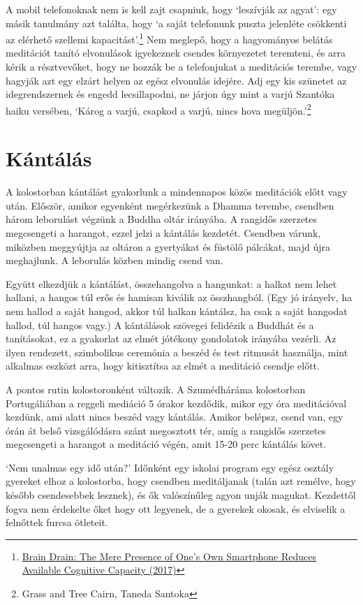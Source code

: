 A mobil telefonoknak nem is kell zajt csapniuk, hogy `leszívják az
agyat': egy másik tanulmány azt találta, hogy `a saját telefonunk puszta
jelenléte csökkenti az elérhető szellemi kapacitást'.\footnote{\href{https://www.journals.uchicago.edu/doi/10.1086/691462}{Brain
  Drain: The Mere Presence of One's Own Smartphone Reduces Available
  Cognitive Capacity (2017)}} Nem meglepő, hogy a hagyományos belátás
meditációt tanító elvonulások igyekeznek csendes környezetet teremteni,
és arra kérik a résztvevőket, hogy ne hozzák be a telefonjukat a
meditációs terembe, vagy hagyják azt egy elzárt helyen az egész
elvonulás idejére. Adj egy kis szünetet az idegrendszernek és engedd
lecsillapodni, ne járjon úgy mint a varjú Szantóka haiku versében,
`Károg a varjú, csapkod a varjú, nincs hova megüljön.'\footnote{Grass
  and Tree Cairn, Taneda Santoka}

\section{Kántálás}

A kolostorban kántálást gyakorlunk a mindennapos közös meditációk előtt
vagy után. Először, amikor egyenként megérkezünk a Dhamma terembe,
csendben három leborulást végzünk a Buddha oltár irányába. A rangidős
szerzetes megcsengeti a harangot, ezzel jelzi a kántálás kezdetét.
Csendben várunk, miközben meggyújtja az oltáron a gyertyákat és füstölő
pálcákat, majd újra meghajlunk. A leborulás közben mindig csend van.

Együtt elkezdjük a kántálást, összehangolva a hangunkat: a halkat nem
lehet hallani, a hangos túl erős és hamisan kiválik az összhangból. (Egy
jó irányelv, ha nem hallod a saját hangod, akkor túl halkan kántálsz, ha
csak a saját hangodat hallod, túl hangos vagy.) A kántálások szövegei
felidézik a Buddhát és a tanításokat, ez a gyakorlat az elmét jótékony
gondolatok irányába vezérli. Az ilyen rendezett, szimbolikus ceremónia a
beszéd és test ritmusát használja, mint alkalmas eszközt arra, hogy
kitisztítsa az elmét a meditáció csendje előtt.

A pontos rutin kolostoronként változik. A Szumédháráma kolostorban
Portugáliában a reggeli mediáció 5 órakor kezdődik, mikor egy óra
meditációval kezdünk, ami alatt nincs beszéd vagy kántálás. Amikor
belépsz, csend van, egy órán át belső vizsgálódásra szánt megosztott
tér, amíg a rangidős szerzetes megcsengeti a harangot a meditáció végén,
amit 15-20 perc kántálás követ.

`Nem unalmas egy idő után?' Időnként egy iskolai program egy egész
osztály gyereket elhoz a kolostorba, hogy csendben meditáljanak (talán
azt remélve, hogy később csendesebbek lesznek), és ők valószínűleg agyon
unják magukat. Kezdettől fogva nem érdekelte őket hogy ott legyenek, de
a gyerekek okosak, és elviselik a felnőttek furcsa ötleteit.

